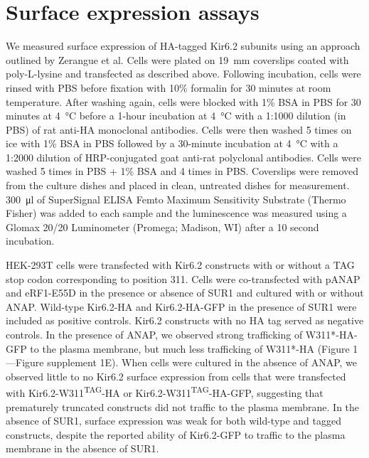 \section{Surface expression assays}
We measured surface expression of HA-tagged Kir6.2 subunits using an approach outlined by Zerangue et al.
Cells were plated on \SI{19}{\milli\metre} coverslips coated with poly-L-lysine and transfected as described above.
Following incubation, cells were rinsed with PBS before fixation with 10\% formalin for 30 minutes at room temperature.
After washing again, cells were blocked with 1\% BSA in PBS for 30 minutes at \SI{4}{\degreeCelsius} before a 1-hour incubation at \SI{4}{\degreeCelsius} with a 1:1000 dilution (in PBS) of rat anti-HA monoclonal antibodies.
Cells were then washed 5 times on ice with 1\% BSA in PBS followed by a 30-minute incubation at \SI{4}{\degreeCelsius} with a 1:2000 dilution of HRP-conjugated goat anti-rat polyclonal antibodies.
Cells were washed 5 times in PBS + 1\% BSA and 4 times in PBS.
Coverslips were removed from the culture dishes and placed in clean, untreated dishes for measurement.
\SI{300}{\micro\litre} of SuperSignal ELISA Femto Maximum Sensitivity Substrate (Thermo Fisher) was added to each sample and the luminescence was measured using a Glomax 20/20 Luminometer (Promega; Madison, WI) after a 10 second incubation.

HEK-293T cells were transfected with Kir6.2 constructs with or without a TAG stop codon corresponding to position 311.
Cells were co-transfected with pANAP and eRF1-E55D in the presence or absence of SUR1 and cultured with or without ANAP.
Wild-type Kir6.2-HA and Kir6.2-HA-GFP in the presence of SUR1 were included as positive controls.
Kir6.2 constructs with no HA tag served as negative controls.
In the presence of ANAP, we observed strong trafficking of W311*-HA-GFP to the plasma membrane, but much less trafficking of W311*-HA (Figure 1—Figure supplement 1E).
When cells were cultured in the absence of ANAP, we observed little to no Kir6.2 surface expression from cells that were transfected with Kir6.2-W311\textsuperscript{TAG}-HA or Kir6.2-W311\textsuperscript{TAG}-HA-GFP, suggesting that prematurely truncated constructs did not traffic to the plasma membrane.
In the absence of SUR1, surface expression was weak for both wild-type and tagged constructs, despite the reported ability of Kir6.2-GFP to traffic to the plasma membrane in the absence of SUR1.

